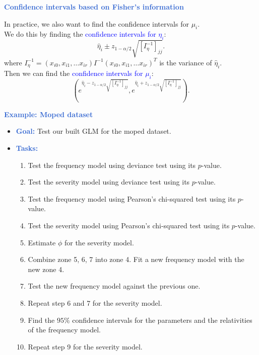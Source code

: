 \documentclass[aspectratio=169,professionalfonts,mathserif]{beamer}
\newcommand{\highlight}[1]{\textcolor{Highlight}{\bf #1}}
\renewcommand{\(}{\left(}
\renewcommand{\)}{\right)}
\renewcommand{\[}{\left[}
\renewcommand{\]}{\right]}
\newcommand{\mytitle}[1]{\vspace*{-1mm}%
  \centerline{\highlight{\Large #1}}\vspace*{3mm}}
\newenvironment{slidebox}{%
  \begin{minipage}[c][7.5cm][t]{14.4cm}\raggedright}{%
  \end{minipage}}
\begin{document}
\begin{frame}\begin{slidebox}
  \mytitle{Confidence intervals based on Fisher’s information}
  In practice, we also want to find the confidence intervals for $\mu_i$. \\
  \vspace{20pt}
  \pause
  We do this by finding the \textcolor{blue}{confidence intervals for $\eta_i$}:
  \begin{equation*}
    \hat{\eta}_i \pm z_{1-\alpha/2} \sqrt{[I_\eta^{-1}]_{jj}} \text{.}
  \end{equation*}
  where $I_\eta^{-1} = (x_{i0}, x_{i1}, \dots x_{ir}) I^{-1} (x_{i0}, x_{i1}, \dots x_{ir})^T$ is the variance of $\hat{\eta}_i$. \\
  \vspace{20pt}
  \pause
  Then we can find the \textcolor{blue}{confidence intervals for $\mu_i$}:
  \begin{equation*}
    (e^{\hat{\eta}_i - z_{1-\alpha/2} \sqrt{[I_\eta^{-1}]_{jj}}}, e^{\hat{\eta}_i + z_{1-\alpha/2} \sqrt{[I_\eta^{-1}]_{jj}}}) \text{.}
  \end{equation*}
\end{slidebox}\end{frame}

\begin{frame}\begin{slidebox}
  \mytitle{Example: Moped dataset}
  
  \begin{itemize}
      \item \highlight{Goal:} Test our built GLM for the moped dataset.
      \pause
      \item \highlight{Tasks:}
      \begin{enumerate}
        \item   Test the frequency model using deviance test using its $p$-value.
        \item   Test the severity model using deviance test using its $p$-value.
        \item   Test the frequency model using Pearson's chi-squared test using its $p$-value.
        \item   Test the severity model using Pearson's chi-squared test using its $p$-value.
        \item   Estimate $\phi$ for the severity model.
        \item   Combine zone 5, 6, 7 into zone 4. Fit a new frequency model with the new zone 4.
        \item   Test the new frequency model against the previous one.
        \item   Repeat step 6 and 7 for the severity model.
        \item   Find the $95\%$ confidence intervals for the parameters and the relativities of the frequency model.
        \item   Repeat step 9 for the severity model.
      \end{enumerate}
  \end{itemize}
\end{slidebox}\end{frame}
\end{document}
